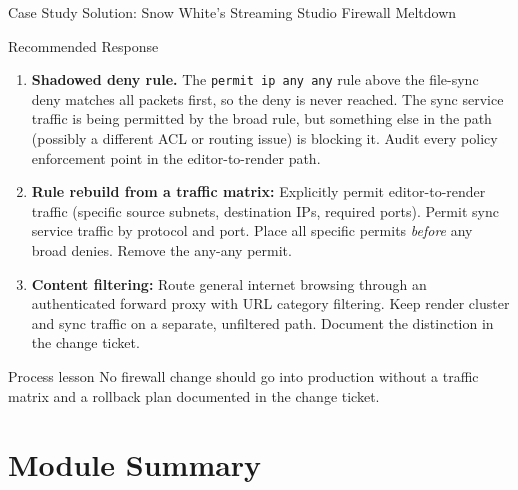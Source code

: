 \documentclass[aspectratio=169]{beamer}  %
\begin{document}
\begin{frame}{Case Study Solution: Snow White's Streaming Studio Firewall Meltdown}
    \begin{exampleblock}{Recommended Response}
        \footnotesize
        \begin{enumerate}
            \item \textbf{Shadowed deny rule.} The \texttt{permit ip any any} rule above the file-sync deny matches all packets first, so the deny is never reached. The sync service traffic is being permitted by the broad rule, but something else in the path (possibly a different ACL or routing issue) is blocking it. Audit every policy enforcement point in the editor-to-render path.
            \item \textbf{Rule rebuild from a traffic matrix:} Explicitly permit editor-to-render traffic (specific source subnets, destination IPs, required ports). Permit sync service traffic by protocol and port. Place all specific permits \emph{before} any broad denies. Remove the any-any permit.
            \item \textbf{Content filtering:} Route general internet browsing through an authenticated forward proxy with URL category filtering. Keep render cluster and sync traffic on a separate, unfiltered path. Document the distinction in the change ticket.
        \end{enumerate}
    \end{exampleblock}
    \begin{alertblock}{Process lesson}
        \footnotesize
        No firewall change should go into production without a traffic matrix and a rollback plan documented in the change ticket.
    \end{alertblock}
\end{frame}

\section*{Module Summary}
\end{document}
